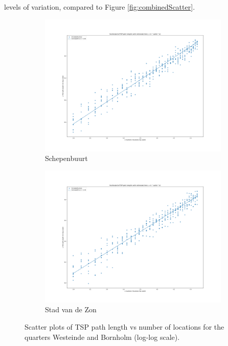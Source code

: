 levels of variation, compared to Figure \ref{fig:combinedScatter}.
\begin{figure}[H]
	\centering
	\begin{subfigure}[b]{0.49\textwidth}
		\includegraphics[width=\textwidth]{../project/plots/scatter_friesland-Westeinde.png}
		\caption{Schepenbuurt}
		\label{fig:WesteindeScatter}
	\end{subfigure}
	\hfill
	\begin{subfigure}[b]{0.49\textwidth}
		\includegraphics[width=\textwidth]{../project/plots/scatter_noord_holland-Bornholm.png}
		\caption{Stad van de Zon}
		\label{fig:BornholmScatter}
	\end{subfigure}
	\caption{Scatter plots of TSP path length vs number of locations for the quarters Westeinde and Bornholm (log-log scale).}
	\label{fig:combinedScatter2}
\end{figure}
